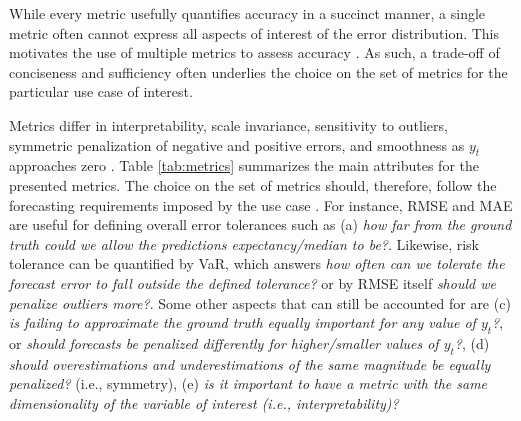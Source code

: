 While every metric usefully quantifies accuracy in a succinct manner, a single metric often cannot express all aspects of interest of the error distribution.
This motivates the use of multiple metrics to assess accuracy \cite{armstrong2002principles}.
As such, a trade-off of conciseness and sufficiency often underlies the choice on the set of metrics for the particular use case of interest.

Metrics differ in interpretability, scale invariance, sensitivity to outliers, symmetric penalization of negative and positive errors, and smoothness as $y_t$ approaches zero \cite{hyndman2006metrics}.
Table \ref{tab:metrics} summarizes the main attributes for the presented metrics.
The choice on the set of metrics should, therefore, follow the forecasting requirements imposed by the use case \cite{armstrong2002principles}.
For instance, RMSE and MAE are useful for defining overall error tolerances such as  (a) \textit{how far from the ground truth could we allow the predictions expectancy/median to be?}.
Likewise, risk tolerance can be quantified by VaR, which answers \textit{how often can we tolerate the forecast error to fall outside the defined tolerance?} or by RMSE itself \textit{should we penalize outliers more?}.
Some other aspects that can still be accounted for are (c) \textit{is failing to approximate the ground truth equally important for any value of $y_t$?}, or \textit{should forecasts be penalized differently for higher/smaller values of $y_t$?}, (d) \textit{should overestimations and underestimations of the same magnitude be equally penalized?} (i.e., symmetry), (e) \textit{is it important to have a metric with the same dimensionality of the variable of interest (i.e., interpretability)?}

